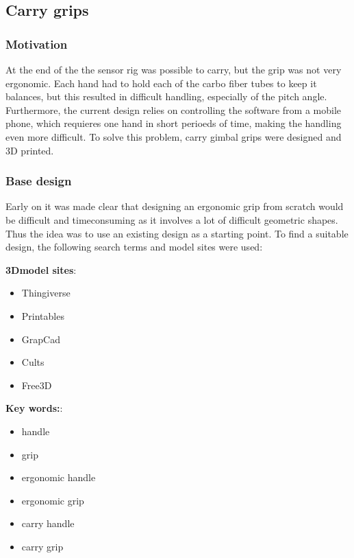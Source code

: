 \subsection{Carry grips}


\subsubsection{Motivation}
At the end of the \preproject the sensor rig was possible to carry, but the grip was not very ergonomic.
Each hand had to hold each of the carbo fiber tubes to keep it balances, but this resulted in difficult handling, especially of the pitch angle.
Furthermore, the current design relies on controlling the software from a mobile phone, which requieres one hand in short perioeds of time, making the handling even more difficult.
To solve this problem, carry gimbal grips were designed and 3D printed.


\subsubsection{Base design}
Early on it was made clear that designing an ergonomic grip from scratch would be difficult and timeconsuming as it involves a lot of difficult geometric shapes.
Thus the idea was to use an existing design as a starting point.
To find a suitable design, the following search terms and model sites were used:

\begin{multicols}{2}
    \textbf{3Dmodel sites}:
    \begin{itemize}
        \item Thingiverse
        \item Printables
        \item GrapCad
        \item Cults
        \item Free3D
    \end{itemize}
    \columnbreak
    \textbf{Key words:}:
    \begin{itemize}
        \item handle
        \item grip
        \item ergonomic handle
        \item ergonomic grip
        \item carry handle
        \item carry grip
    \end{itemize}
\end{multicols}

